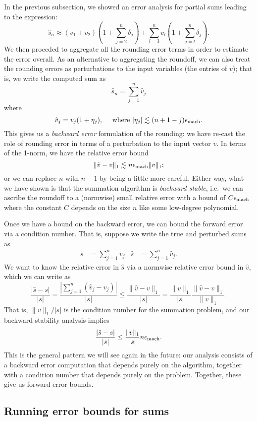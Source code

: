 \documentclass[12pt, leqno]{article} %
\begin{document}
In the previous subsection, we showed an error analysis for partial sums
leading to the expression:
\[
  \hat{s}_n \approx (v_1 + v_2) \left(1 + \sum_{j=2}^n \delta_j \right)
              + \sum_{l=3}^n v_l \left( 1 + \sum_{j=l}^n \delta_j \right).
\]
We then proceded to aggregate all the rounding error terms in order to
estimate the error overall.  As an alternative to aggregating the roundoff,
we can also treat the rounding errors as perturbations to the input
variables (the entries of $v$); that is, we write the computed sum as
\[
  \hat{s}_n = \sum_{j=1}^n \hat{v}_j
\]
where
\[
  \hat{v}_j = v_j (1+\eta_j), \quad
  \mbox{ where }|\eta_j| \lesssim (n+1-j) \epsilon_{\mathrm{mach}}.
\]
This gives us a {\em backward error} formulation of the rounding:
we have re-cast the role of rounding error in terms of a
perturbation to the input vector $v$.  In terms of the 1-norm,
we have the relative error bound
\[
  \|\hat{v}-v\|_1 \lesssim n \epsilon_{\mathrm{mach}} \|v\|_1;
\]
or we can replace $n$ with $n-1$ by being a little more careful.
Either way, what we have shown is that the summation algorithm
is {\em backward stable}, i.e.~we can ascribe the roundoff to
a (normwise) small relative error with a bound of $C \epsilon_{\mathrm{mach}}$
where the constant $C$ depends on the size $n$ like some low-degree
polynomial.

Once we have a bound on the backward error, we can bound the forward
error via a condition number.  That is, suppose we write the true
and perturbed sums as
\begin{align*}
  s &= \sum_{j=1}^n v_j &
  \hat{s} &= \sum_{j=1}^n \hat{v}_j.
\end{align*}
We want to know the relative error in $\hat{s}$ via a normwise
relative error bound in $\hat{v}$, which we can write as
\[
  \frac{|\hat{s}-s|}{|s|} =
  \frac{|\sum_{j=1}^n (\hat{v}_j-v_j)|}{|s|} \leq
  \frac{\|\hat{v}-v\|_1}{|s|} =
  \frac{\|v\|_1}{|s|} \frac{\|\hat{v}-v\|_1}{\|v\|_1}.
\]
That is, $\|v\|_1/|s|$ is the condition number for the summation
problem, and our backward stability analysis implies
\[
  \frac{|\hat{s}-s|}{|s|} \leq
  \frac{\|v\|_1}{|s|} n \epsilon_{\mathrm{mach}}.
\]
This is the general pattern we will see again in the future:
our analysis consists of a backward error computation that depends
purely on the algorithm, together with a condition number that depends
purely on the problem.  Together, these give us forward error bounds.

\subsection{Running error bounds for sums}
\end{document}
